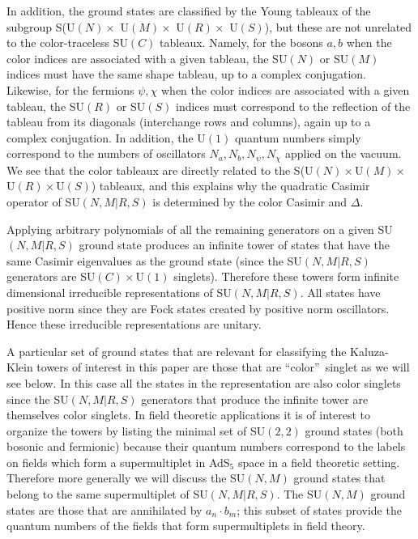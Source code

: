 \documentclass[a4paper,aps,preprint,nofootinbib]{revtex4}
\begin{document}
In addition, the ground states are classified by the Young tableaux of the
subgroup S(U$\left( N\right) \times$ U$\left( M\right) \times$ U$\left(
R\right) \times$ U$\left( S\right) $), but these are not unrelated to the
color-traceless SU$(C)$ tableaux. Namely, for the bosons $a,b$ when the
color indices are associated with a given tableau, the SU$(N)$ or SU$(M)$
indices must have the same shape tableau, up to a complex conjugation.
Likewise, for the fermions $\psi,\chi$ when the color indices are associated
with a given tableau, the SU$(R)$ or SU$(S)$ indices must correspond to the
reflection of the tableau from its diagonals (interchange rows and columns),
again up to a complex conjugation. In addition, the U$\left( 1\right) $
quantum numbers simply correspond to the numbers of oscillators $%
N_{a},N_{b},N_{\psi},N_{\chi }$ applied on the vacuum. We see that the color
tableaux are directly related to the S(U$\left( N\right) \times$U$\left(
M\right) \times$U$\left( R\right) \times$U$\left( S\right) $) tableaux, and
this explains why the quadratic Casimir operator of SU$\left( N,M|R,S\right)
$ is determined by the color Casimir and $\Delta.$

Applying arbitrary polynomials of all the remaining generators on a given SU$%
\left(N,M|R,S\right)$ ground state produces an infinite tower of states that
have the same Casimir eigenvalues as the ground state (since the SU$%
\left(N,M|R,S\right)$ generators are SU$\left( C\right) \times$U$\left(
1\right)$ singlets). Therefore these towers form infinite dimensional
irreducible representations of SU$\left( N,M|R,S\right).$ All states have
positive norm since they are Fock states created by positive norm
oscillators. Hence these irreducible representations are unitary.

A particular set of ground states that are relevant for classifying the
Kaluza-Klein towers of interest in this paper are those that are
\textquotedblleft color\textquotedblright\ singlet as we will see below. In
this case all the states in the representation are also color singlets since
the SU$\left( N,M|R,S\right) $ generators that produce the infinite tower
are themselves color singlets. In field theoretic applications it is of
interest to organize the towers by listing the minimal set of SU$\left(
2,2\right) $ ground states (both bosonic and fermionic) because their
quantum numbers correspond to the labels on fields which form a
supermultiplet in AdS$_{5}$ space in a field theoretic setting. Therefore
more generally we will discuss the SU$\left( N,M\right) $ ground states that
belong to the same supermultiplet of SU$\left( N,M|R,S\right) .$ The SU$%
\left( N,M\right) $ ground states are those that are annihilated by $
a_{n}\cdot b_{m}$; this subset of states provide the quantum numbers of the
fields that form supermultiplets in field theory.
\end{document}
